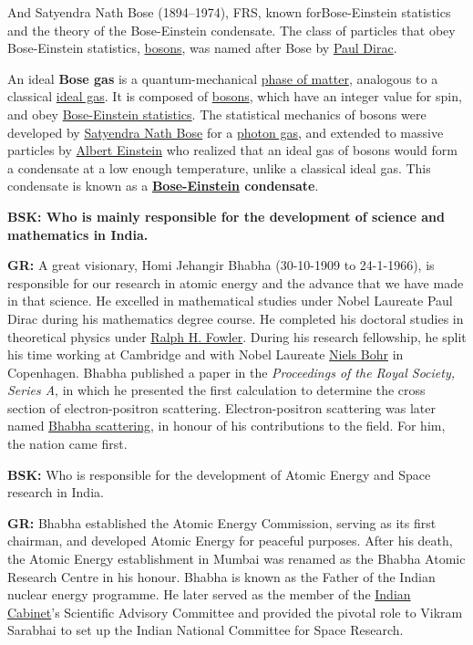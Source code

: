 And Satyendra Nath Bose (1894--1974), FRS, known for\break Bose-Einstein statistics and the theory of the Bose-Einstein condensate. The class of particles that obey Bose-Einstein statistics, \underline{bosons}, was named after Bose by \underline{Paul Dirac}.

An ideal \textbf{Bose gas} is a quantum-mechanical \underline{phase of matter}, analogous to a classical \underline{ideal gas}. It is composed of \underline{bosons}, which have an integer value for spin, and obey \underline{Bose-Einstein statistics}. The statistical mechanics of bosons were developed by \underline{Satyendra Nath Bose} for a \underline{photon gas}, and extended to massive particles by \underline{Albert Einstein} who realized that an ideal gas of bosons would form a condensate at a low enough temperature, unlike a classical ideal gas. This condensate is known as a \textbf{\underline{Bose-Einstein} condensate}.

\textbf{BSK: Who is mainly responsible for the development of science and mathematics in India.}

\textbf{GR:}  A great visionary, Homi Jehangir Bhabha (30-10-1909 to 24-1-1966), is responsible for our research in atomic energy and the advance that we have made in that science. He excelled in mathematical studies under Nobel Laureate Paul Dirac during his mathematics degree course.  He completed his doctoral studies in theoretical physics under \underline{Ralph H. Fowler}. During his research fellowship, he split his time working at Cambridge and with Nobel Laureate \underline{Niels Bohr} in Copenhagen. Bhabha published a paper in the \textit{Proceedings of the Royal Society, Series A}, in which he presented the first calculation to determine the cross section of electron-positron scattering. Electron-positron scattering was later named \underline{Bhabha scattering}, in honour of his contributions to the field. For him, the nation came first.

\textbf{BSK:} Who is responsible for the development of Atomic Energy and Space research in India.

\textbf{GR:} Bhabha established the Atomic Energy Commission, serving as its first chairman, and developed Atomic Energy for peaceful purposes. After his death, the Atomic Energy establishment in Mumbai was renamed as the Bhabha Atomic Research Centre in his honour. Bhabha is known as the Father of the Indian nuclear energy programme. He later served as the member of the \underline{Indian Cabinet}'s Scientific Advisory Committee and provided the pivotal role to Vikram Sarabhai to set up the Indian National Committee for Space Research.

